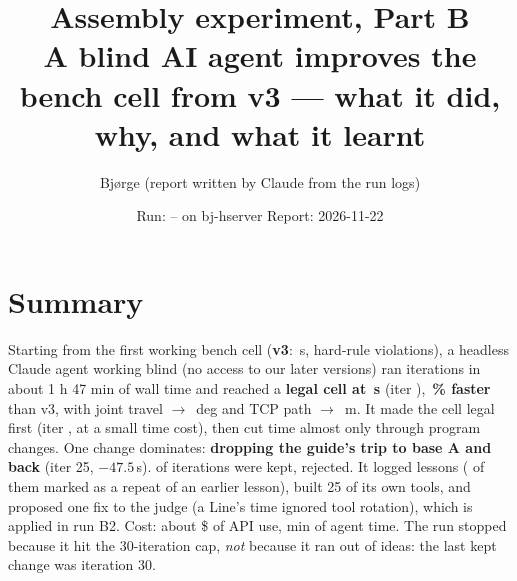 


\title{\vspace{-14mm}\textbf{Assembly experiment, Part B}\\[1mm]
\large A blind AI agent improves the bench cell from v3 --- what it did, why, and what it learnt}
\author{Bjørge (report written by Claude from the run logs)}
\date{Run: \pbtstart{} -- \pbtend{} on bj-hserver \quad Report: 2026-11-22}


\maketitle
\thispagestyle{fancy}

\section*{Summary}
Starting from the first working bench cell (\textbf{v3}: \pbstartcycle{}\,s, \pbstartviol{} hard-rule violations), a
headless Claude agent working blind (no access to our later versions) ran \pbniter{} iterations in about 1 h 47 min
of wall time and reached a \textbf{legal cell at \pbbestcycle{}\,s} (iter \pbbestit{}), \textbf{\pbgainpct{}\,\% faster}
than v3, with joint travel \pbstartjoints{} $\to$ \pbbestjoints{}\,deg and TCP path \pbstartpath{} $\to$ \pbbestpath{}\,m.
It made the cell legal first (iter \pbfirstlegal{}, at a small time cost), then cut time almost only through
program changes. One change dominates: \textbf{dropping the guide's trip to base A and back} (iter 25, $-47.5$\,s).
\pbnkept{} of \pbniter{} iterations were kept, \pbnrej{} rejected. It logged \pbnlessons{} lessons
(\pbnagain{} of them marked as a repeat of an earlier lesson), built 25 of its own tools, and proposed one fix to
the judge (a Line's time ignored tool rotation), which is applied in run B2. Cost: about \$\pbcost{} of API use,
\pbagentmin{} min of agent time. The run stopped because it hit the 30-iteration cap, \emph{not} because it ran out
of ideas: the last kept change was iteration 30.

